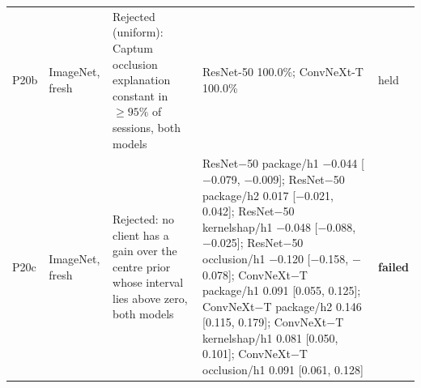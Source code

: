 \begin{footnotesize}
\begin{longtable}{L{0.9cm}L{1.9cm}L{5.0cm}L{3.4cm}L{1.1cm}}
P20b & ImageNet, fresh & Rejected (uniform): Captum occlusion explanation constant in $\ge95\%$ of sessions, both models & ResNet-50 100.0\%; ConvNeXt-T 100.0\% & held \\
P20c & ImageNet, fresh & Rejected: no client has a gain over the centre prior whose interval lies above zero, both models & ResNet$-$50 package/h1 $-$0.044 [$-$0.079, $-$0.009]; ResNet$-$50 package/h2 0.017 [$-$0.021, 0.042]; ResNet$-$50 kernelshap/h1 $-$0.048 [$-$0.088, $-$0.025]; ResNet$-$50 occlusion/h1 $-$0.120 [$-$0.158, $-$0.078]; ConvNeXt$-$T package/h1 0.091 [0.055, 0.125]; ConvNeXt$-$T package/h2 0.146 [0.115, 0.179]; ConvNeXt$-$T kernelshap/h1 0.081 [0.050, 0.101]; ConvNeXt$-$T occlusion/h1 0.091 [0.061, 0.128] & \textbf{failed} \\
\bottomrule
\end{longtable}
\end{footnotesize}

